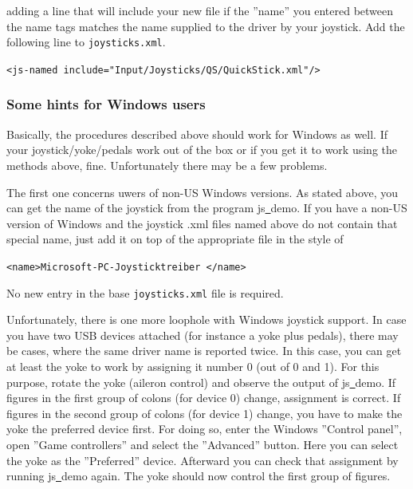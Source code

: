 \noindent 
adding a line that will include your new file if the ''name'' you entered between the name tags matches the name supplied to the driver by your joystick.  Add the following line to \texttt{joysticks.xml}.
\medskip

\noindent
	\texttt{<js-named include="Input/Joysticks/QS/QuickStick.xml"/>}
\medskip

\subsubsection{Some hints for Windows users\label{joyxp}}
Basically, the procedures described above should work for Windows as well. If your joystick/yoke/pedals work out of the box or if you get it to work using the methods above, fine. Unfortunately there may be a few problems.

The first one concerns uwers of non-US Windows versions. As stated above, you can get the name of the joystick from the program js\underline{~}demo. If you have a non-US version of Windows and the joystick .xml files named above do not contain that special name, just add it on top of the appropriate file in the style of
\medskip

 \texttt{<name>Microsoft-PC-Joysticktreiber </name>}
 \medskip

\noindent
No new entry in the base \texttt{joysticks.xml} file is required.

Unfortunately, there is one more loophole with Windows joystick support. In
case you have two USB devices attached (for instance a yoke plus pedals),
there may be cases, where the same driver name is reported twice. In this
case, you can get at least the yoke to work by assigning it number 0 (out of
0 and 1). For this purpose, rotate the yoke (aileron control) and observe
the output of js\underline{~}demo. If figures in the first group of colons
(for device 0) change, assignment is correct. If figures in the second group
of colons (for device 1) change, you have to make the yoke the preferred
device first. For doing so, enter the
Windows ''Control panel'', open ''Game controllers'' and select the
''Advanced'' button. Here you can select the yoke as the ''Preferred''
device. Afterward you can check that assignment by running
js\underline{~}demo again. The yoke should now control the first group of
figures.

